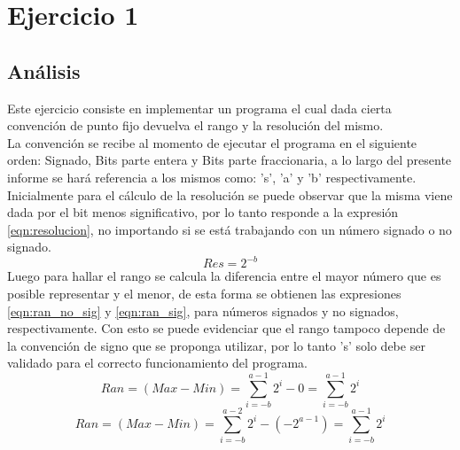 \newpage
\section{Ejercicio 1}
\subsection{An\'alisis}
\noindent
Este ejercicio consiste en implementar un programa el cual dada cierta convenci\'on de punto fijo devuelva el rango y la resoluci\'on del mismo.\\
La convenci\'on se recibe al momento de ejecutar el programa en el siguiente orden: Signado, Bits parte entera y Bits parte fraccionaria, a lo largo del presente informe se har\'a referencia a los mismos como: 's', 'a' y 'b' respectivamente.\\
Inicialmente para el c\'alculo de la resoluci\'on se puede observar que la misma viene dada por el bit menos significativo, por lo tanto responde a la expresi\'on \ref{eqn:resolucion}, no importando si se est\'a trabajando con un n\'umero signado o no signado.
\begin{equation}
    Res = 2^{-b}
    \label{eqn:resolucion}
\end{equation}
Luego para hallar el rango se calcula la diferencia entre el mayor n\'umero que es posible representar y el menor, de esta forma se obtienen las expresiones \ref{eqn:ran_no_sig} y \ref{eqn:ran_sig}, para n\'umeros signados y no signados, respectivamente. Con esto se puede evidenciar que el rango tampoco depende de la convenci\'on de signo que se proponga utilizar, por lo tanto 's' solo debe ser validado para el correcto funcionamiento del programa.
\begin{equation}
    Ran = (Max-Min) = \sum_{i=-b}^{a-1}2^{i} - 0 = \sum_{i=-b}^{a-1}2^{i} 
    \label{eqn:ran_no_sig}
\end{equation}
\begin{equation}
    Ran = (Max-Min) = \sum_{i=-b}^{a-2}2^{i} - (-2^{a-1}) = \sum_{i=-b}^{a-1}2^{i} 
    \label{eqn:ran_sig}
\end{equation}
